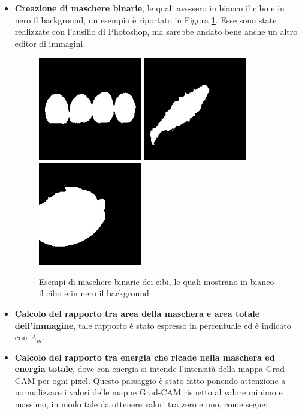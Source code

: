 \begin{itemize}
\item \textbf{Creazione di maschere binarie}, le quali avessero in bianco il cibo e in nero il background, un esempio è riportato in Figura \ref{mask}. Esse sono state realizzate con l'ausilio di Photoshop, ma sarebbe andato bene anche un altro editor di immagini.
\begin{figure}[H]
\centering
\includegraphics[height=45mm]{images/Resized53.jpg}
\quad
\includegraphics[height=45mm]{images/Resized85.jpg}
\quad
\includegraphics[height=45mm]{images/Resized1.jpg}
\quad
\caption{Esempi di maschere binarie dei cibi, le quali mostrano in bianco il cibo e in nero il background}
\label{mask}
\end{figure}
\item \textbf{Calcolo del rapporto tra area della maschera e area totale dell'immagine}, tale rapporto è stato espresso in percentuale ed è indicato con $A_{m}$.
\item \textbf{Calcolo del rapporto tra energia che ricade nella maschera ed energia totale}, dove con energia si intende l'intensità della mappa Grad-CAM per ogni pixel. Questo passaggio è stato fatto ponendo attenzione a normalizzare i valori delle mappe Grad-CAM rispetto al valore minimo e massimo, in modo tale da ottenere valori tra zero e uno, come segue:

\end{itemize}
